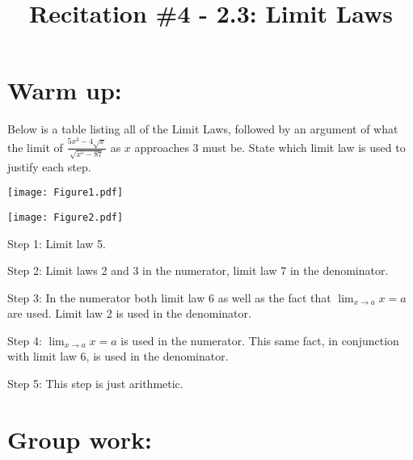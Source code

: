 \message{ !name(limitLaws.tex)}\documentclass[handout,nooutcomes]{ximera}
\title{Recitation \#4 - 2.3:  Limit Laws}
\begin{document}

\begin{abstract}		\end{abstract}
\maketitle

\section*{Warm up:} 
Below is a table listing all of the Limit Laws, followed by an argument of what the limit of $ \frac{5x^3 - 4 \sqrt{x}}{\sqrt{x^5 - 87}}  $ as $x$ approaches 3 must be.  State which limit law is used to justify each step.

	\begin{image}
	\texttt{[image: Figure1.pdf]}
	\end{image}

	\begin{image}
	\texttt{[image: Figure2.pdf]}
	\end{image}
\newpage
	\begin{freeResponse}
	Step 1:  Limit law 5.
		
	Step 2:  Limit laws 2 and 3 in the numerator, limit law 7 in the denominator.
		
	Step 3:  In the numerator both limit law 6 as well as the fact that $\lim_{x \to a}x = a$ are used.  Limit law 2 is used in the denominator.
		
	Step 4:  $\lim_{x \to a}x = a$ is used in the numerator.  This same fact, in conjunction with limit law 6, is used in the denominator.
		
	Step 5:  This step is just arithmetic.
	\end{freeResponse}
	
	

\section*{Group work:}
\end{document}

